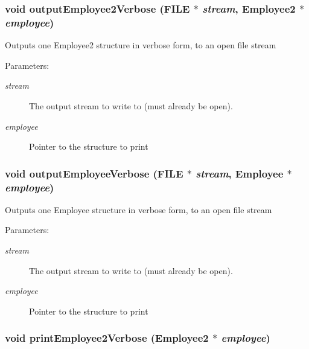 \subsubsection{\setlength{\rightskip}{0pt plus 5cm}void output\-Employee2Verbose (FILE $\ast$ {\em stream}, \bf{Employee2} $\ast$ {\em employee})}\label{employee_8h_0e904654f127aeefbd9a1b8fa1913d68}


Outputs one Employee2 structure in verbose form, to an open file stream \begin{Desc}
\item[Parameters:]
\begin{description}
\item[{\em stream}]The output stream to write to (must already be open). \item[{\em employee}]Pointer to the structure to print \end{description}
\end{Desc}
\subsubsection{\setlength{\rightskip}{0pt plus 5cm}void output\-Employee\-Verbose (FILE $\ast$ {\em stream}, \bf{Employee} $\ast$ {\em employee})}\label{employee_8h_724c7914065fffbb2da47f446b1227ea}


Outputs one Employee structure in verbose form, to an open file stream \begin{Desc}
\item[Parameters:]
\begin{description}
\item[{\em stream}]The output stream to write to (must already be open). \item[{\em employee}]Pointer to the structure to print \end{description}
\end{Desc}
\subsubsection{\setlength{\rightskip}{0pt plus 5cm}void print\-Employee2Verbose (\bf{Employee2} $\ast$ {\em employee})}\label{employee_8h_ad83702fe144eb7a8c8626da8b0fdea1}


